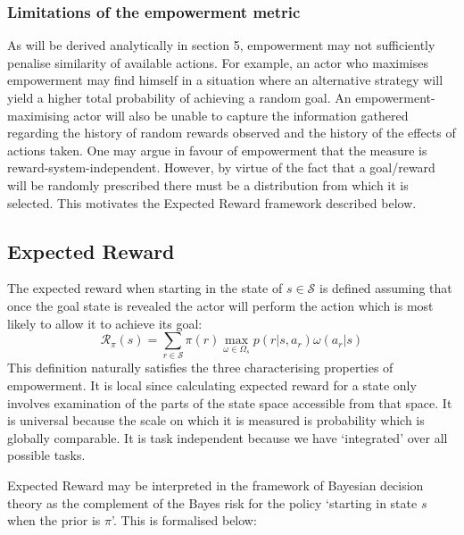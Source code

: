 \documentclass{article}
\newcommand{\Ss}{\mathcal{S}}
\newcommand{\Rr}{\mathcal{R}}
\begin{document}
\subsubsection{Limitations of the empowerment metric}
As will be derived analytically in section 5, empowerment may not sufficiently penalise similarity of available actions.
For example, an actor who maximises empowerment may find himself in a situation where an alternative strategy will yield a higher total probability of achieving a random goal.
An empowerment-maximising actor will also be unable to capture the information gathered regarding the history of random rewards observed and the history of the effects of actions taken.
One may argue in favour of empowerment that the measure is reward-system-independent.
However, by virtue of the fact that a goal/reward will be randomly prescribed there must be a distribution from which it is selected. This motivates the Expected Reward framework described below.

\subsection{Expected Reward}
The expected reward when starting in the state of $s\in\mathcal{S}$ is defined assuming that once the goal state is revealed the actor will perform the action which is most likely to allow it to achieve its goal:
\[\Rr_\pi(s) = \sum_{r\in\Ss} \pi(r) \max_{\omega\in\Omega_s} p(r|s,a_r)\omega(a_r|s)\]
This definition naturally satisfies the three characterising properties of empowerment. It is local since calculating expected reward for a state only involves examination of the parts of the state space accessible from that space. It is universal because the scale on which it is measured is probability which is globally comparable. It is task independent because we have `integrated' over all possible tasks.

Expected Reward may be interpreted in the framework of Bayesian decision theory as the complement of the Bayes risk for the policy `starting in state $s$ when the prior is $\pi$'. This is formalised below: 
\end{document}
